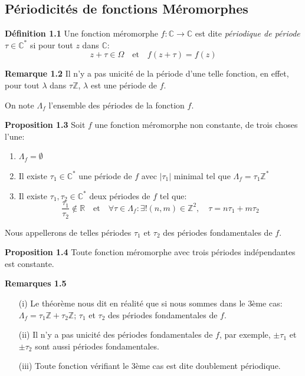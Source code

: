 \documentclass{article}
\begin{document}
\subsection{Périodicités de fonctions Méromorphes }
\textbf{Définition 1.1} \quad Une fonction méromorphe \( f: \mathbb{C} \to \mathbb{C} \) est dite \textit{périodique de période} \( \tau \in \mathbb{C}^* \) si pour tout \( z \) dans \( \mathbb{C} \): 
\[ z + \tau \in \Omega \quad \text{et} \quad f(z + \tau) = f(z) \]


\textbf{Remarque 1.2} \quad Il n'y a pas unicité de la période d'une telle fonction, en effet, pour tout \( \lambda \) dans \(  \tau  \mathbb{Z} \), \( \lambda\) est une période de \( f \).


On note \( \Lambda_f \) l'ensemble des périodes de la fonction \( f \).

\textbf{Proposition 1.3} \quad Soit \( f \) une fonction méromorphe non constante, de trois choses l'une:
\begin{enumerate}
    \item \( \Lambda_f = \emptyset \)
    \item Il existe \( \tau_1 \in \mathbb{C}^* \) une période de \( f \) avec \( |\tau_1| \) minimal tel que \( \Lambda_f = \tau_1 \mathbb{Z}^* \)
    \item Il existe \( \tau_1, \tau_2 \in \mathbb{C}^* \) deux périodes de \( f \) tel que:
    \[
\frac{\tau_1}{\tau_2} \notin \mathbb{R} \quad \text{et} \quad \forall \tau \in \Lambda_f:  \exists! (n, m) \in \mathbb{Z}^2, \quad \tau = n\tau_1 + m\tau_2
\]
\end{enumerate}
Nous appellerons de telles périodes \( \tau_1 \) et \( \tau_2 \) des périodes fondamentales de \( f \).



\textbf{Proposition 1.4} \quad Toute fonction méromorphe avec trois périodes indépendantes est constante.


\textbf{Remarques 1.5}
\begin{itemize}
    \item[(i)] Le théorème nous dit en réalité que si nous sommes dans le 3ème cas: \( \Lambda_f = \tau_1 \mathbb{Z} + \tau_2 \mathbb{Z} \); \( \tau_1 \) et \( \tau_2 \) des périodes fondamentales de \( f \).
    \item[(ii)] Il n'y a pas unicité des périodes fondamentales de \( f \), par exemple, \( \pm \tau_1 \) et \( \pm \tau_2 \) sont aussi périodes fondamentales.
    \item[(iii)] Toute fonction vérifiant le 3ème cas est dite doublement périodique.
\end{itemize}
\end{document}
